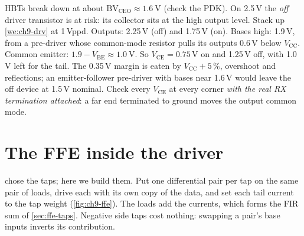 \begin{pitfall}
\sgx{} HBTs break down at about $\mathrm{BV}_\mathrm{CEO}\approx\qty{1.6}{\volt}$ (check the PDK). On 2.5\,V the \emph{off} driver transistor is at risk: its collector sits at the high output level. Stack up \cref{we:ch9-drv} at 1\,Vppd. Outputs: 2.25\,V (off) and 1.75\,V (on). Bases high: 1.9\,V, from a pre-driver whose common-mode resistor pulls its outputs 0.6\,V below $V_\mathrm{CC}$. Common emitter: $1.9-V_\mathrm{BE}\approx\qty{1.0}{\volt}$. So $V_\mathrm{CE}=0.75$\,V on and 1.25\,V off, with 1.0\,V left for the tail. The 0.35\,V margin is eaten by $V_\mathrm{CC}+5\,\%$, overshoot and reflections; an emitter-follower pre-driver with bases near 1.6\,V would leave the off device at 1.5\,V nominal. Check every $V_\mathrm{CE}$ at every corner \emph{with the real RX termination attached}: a far end terminated to ground moves the output common mode.
\end{pitfall}

\section{The FFE inside the driver}\label{sec:ffe-impl}

 chose the taps; here we build them. Put one differential pair per tap on the same pair of loads, drive each with its own copy of the data, and set each tail current to the tap weight (\cref{fig:ch9-ffe}). The loads add the currents, which forms the FIR sum of \cref{sec:ffe-taps}. Negative side taps cost nothing: swapping a pair's base inputs inverts its contribution.

